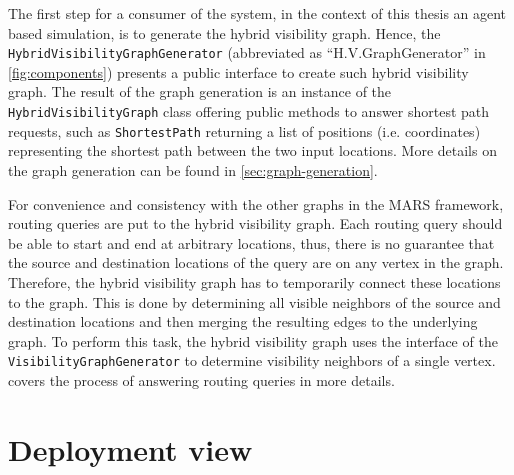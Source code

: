 	The first step for a consumer of the system, in the context of this thesis an agent based simulation, is to generate the hybrid visibility graph.
	Hence, the \texttt{HybridVisibilityGraphGenerator} (abbreviated as \enquote{H.V.GraphGenerator} in \cref{fig:components}) presents a public interface to create such hybrid visibility graph.
	The result of the graph generation is an instance of the \texttt{HybridVisibilityGraph} class offering public methods to answer shortest path requests, such as \texttt{ShortestPath} returning a list of positions (i.e. coordinates) representing the shortest path between the two input locations.
	More details on the graph generation can be found in \cref{sec:graph-generation}.
	
	For convenience and consistency with the other graphs in the MARS framework, routing queries are put to the hybrid visibility graph.
	Each routing query should be able to start and end at arbitrary locations, thus, there is no guarantee that the source and destination locations of the query are on any vertex in the graph.
	Therefore, the hybrid visibility graph has to temporarily connect these locations to the graph.
	This is done by determining all visible neighbors of the source and destination locations and then merging the resulting edges to the underlying graph.
	To perform this task, the hybrid visibility graph uses the interface of the \texttt{VisibilityGraphGenerator} to determine visibility neighbors of a single vertex.
	 covers the process of answering routing queries in more details.

\section{Deployment view}


